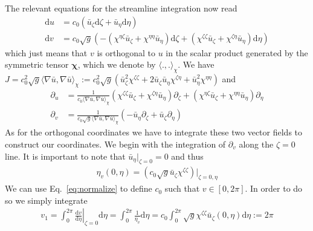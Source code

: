\documentclass{hitec} %
\renewcommand{\d}{\mathrm{d}}
\renewcommand{\vec}[1]{{\mathbf{#1}}}
\begin{document}
The relevant equations for the streamline integration now read
\begin{subequations}
\begin{align}
    \d u &= c_0(\bar u_\zeta\d \zeta + \bar u_\eta \d \eta) \\
    \d v &= c_0\sqrt{g}(-(\chi^{\eta\zeta}\bar u_\zeta + \chi^{\eta\eta}\bar u_\eta)\d \zeta + (\chi^{\zeta\zeta}\bar u_\zeta + \chi^{\zeta\eta}\bar u_\eta)\d \eta)
\end{align}
\label{eq:contravariant_monitor}
\end{subequations} 
which just means that $v$
is orthogonal to $u$ in the scalar product 
generated by the symmetric tensor $\vec \chi$, which we denote by $\langle . , .\rangle_\chi$.
We have 
$J=c_0^2 \sqrt{g} \langle \nabla \bar u,\nabla \bar u \rangle_\chi
  := c_0^2\sqrt{g} (\bar u_\zeta^2\chi^{\zeta\zeta} + 2 \bar u_\zeta \bar u_\eta \chi^{\zeta\eta} + \bar u_\eta^2\chi^{\eta\eta})$ 
and 
\begin{subequations}
\begin{align}
  \partial_u &= \frac{1}{c_0\langle\nabla \bar u,\nabla \bar u\rangle_\chi} 
        (\chi^{\zeta\zeta}\bar u_\zeta + \chi^{\zeta\eta}\bar u_\eta)\partial_\zeta + 
        (\chi^{\eta\zeta}\bar u_\zeta + \chi^{\eta\eta}\bar u_\eta)\partial_\eta\label{eq:basis_monitora}\\
  \partial_v &= \frac{1}{c_0\sqrt{g}\langle\nabla \bar u,\nabla \bar u\rangle_\chi} 
          (-\bar u_\eta \partial_\zeta + \bar u_\zeta\partial_\eta)
  \label{eq:basis_monitorb}
\end{align}
\label{eq:basis_monitor}
\end{subequations} 
As for the orthogonal coordinates we have to integrate these two vector fields to construct our coordinates. 
We begin with the integration of $\partial_v$ along the $\zeta=0$ line. 
It is important to note that $\bar u_\eta|_{\zeta=0} = 0$ and thus
\begin{align}
  \eta_v(0, \eta) = \left( c_0\sqrt{g}\bar u_\zeta \chi^{\zeta\zeta} \right)|_{\zeta= 0, \eta}
  \label{eq:normalize}
\end{align}
We can use Eq.~\eqref{eq:normalize} to define $c_0$ such that $v\in[0,2\pi]$. 
In order to do so we simply integrate 
\begin{align}
  v_1 = \int_0^{2\pi} \left .\frac{\d v}{\d \eta}\right|_{\zeta=0} \d \eta = \int_0^{2\pi} \frac{1}{\eta_v}\d \eta = c_0 \int_0^{2\pi} \sqrt{g}\chi^{\zeta\zeta}\bar u_\zeta(0,\eta) \d \eta := 2\pi
  \label{eq:computec0}
\end{align}
\end{document}

